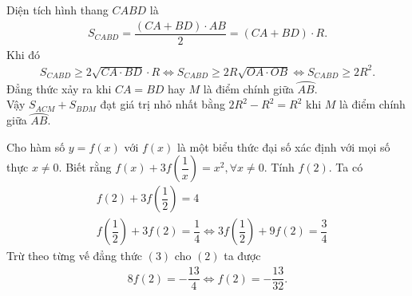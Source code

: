 \begin{ex}
{\begin{enumerate}
		 Diện tích hình thang $CABD$ là
		 \begin{eqnarray*}
		  S_{CABD} =\dfrac{(CA+BD)\cdot AB}{2}=(CA+BD)\cdot R.
		 \end{eqnarray*}
		 Khi đó
		 \begin{eqnarray*}
		  S_{CABD} \geq 2\sqrt{CA \cdot BD} \cdot R \Leftrightarrow S_{CABD} \geq 2R\sqrt{OA \cdot OB} \Leftrightarrow S_{CABD} \geq 2R^2.
		 \end{eqnarray*}
	     Đẳng thức xảy ra khi $CA=BD$ hay $M$ là điểm chính giữa $\wideparen{AB}$.\\
	     Vậy $S_{ACM}+S_{BDM}$ đạt giá trị nhỏ nhất bằng $2R^2-R^2=R^2$ khi $M$ là điểm chính giữa $\wideparen{AB}$.
		\end{enumerate}
	}
\end{ex}

\begin{ex}%
	Cho hàm số $y=f(x)$ với $f(x)$ là một biểu thức đại số xác định với mọi số thực $x\neq 0$. Biết rằng $f(x)+3f\left(\dfrac{1}{x} \right)=x^2,\forall x\neq 0$. Tính $f(2)$.
	\loigiai
	{
	Ta có
	\begin{align*}
	 & f(2)+3f\left(\dfrac{1}{2}\right) = 4 \tag{2}\\
	 & f\left(\dfrac{1}{2}\right)+3f(2)=\dfrac{1}{4} \Leftrightarrow 3f\left(\dfrac{1}{2}\right)+9f(2)=\dfrac{3}{4} \tag{3}
	\end{align*}
	Trừ theo từng vế đẳng thức $(3)$ cho $(2)$ ta được
	\begin{eqnarray*}
	 8f(2)=-\dfrac{13}{4} \Leftrightarrow f(2) = -\dfrac{13}{32}.
	\end{eqnarray*}
	}
\end{ex}

